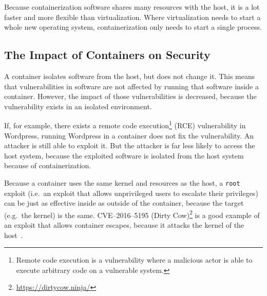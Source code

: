 Because containerization software shares many resources with the host, it is a lot faster and more flexible than virtualization. Where virtualization needs to start a whole new operating system, containerization only needs to start a single process.

\subsection{The Impact of Containers on Security}
A container isolates software from the host, but does not change it. This means that vulnerabilities in software are not affected by running that software inside a container. However, the impact of those vulnerabilities is decreased, because the vulnerability exists in an isolated environment.

If, for example, there exists a remote code execution\footnote{Remote code execution is a vulnerability where a malicious actor is able to execute arbitrary code on a vulnerable system.} (RCE) vulnerability in Wordpress, running Wordpress in a container does not fix the vulnerability. An attacker is still able to exploit it. But the attacker is far less likely to access the host system, because the exploited software is isolated from the host system because of containerization.

\medskip

Because a container uses the same kernel and resources as the host, a \lstinline{root} exploit (i.e.\ an exploit that allows unprivileged users to escalate their privileges) can be just as effective inside as outside of the container, because the target (e.g.\ the kernel) is the same. CVE--2016--5195 (Dirty Cow)\footnote{\url{https://dirtycow.ninja/}} is a good example of an exploit that allows container escapes, because it attacks the kernel of the host~\cite{Dirty-Cow-Escape}.
